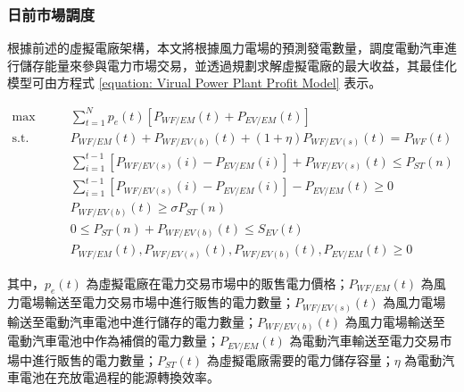\subsubsection{日前市場調度}

根據前述的虛擬電廠架構，本文將根據風力電場的預測發電數量，調度電動汽車進行儲存能量來參與電力市場交易，並透過規劃求解虛擬電廠的最大收益，其最佳化模型可由方程式 \eqref{equation: Virual Power Plant Profit Model} 表示。

\begin{subequations}\label{equation: Virual Power Plant Profit Model}
  \begin{alignat}{2}
    \max        \qquad & \sum_{t = 1}^{N} p_{e}(t) [P_{WF/EM}(t) + P_{EV/EM}(t)]      \label{subequation: Virual Power Plant Profit Model 1} \\
    \text{s.t.} \qquad & P_{WF/EM}(t) + P_{WF/EV(b)}(t) + (1 + \eta)P_{WF/EV(s)}(t) = P_{WF}(t) \label{subequation: Virual Power Plant Profit Model 2} \\
                       & \sum_{i=1}^{t-1} \left[ P_{WF/EV(s)}(i) - P_{EV/EM}(i) \right] + P_{WF/EV(s)}(t) \leq P_{ST}(n)                    \label{subequation: Virual Power Plant Profit Model 3} \\
                       & \sum_{i=1}^{t-1} \left[ P_{WF/EV(s)}(i) - P_{EV/EM}(i) \right] - P_{EV/EM}(t) \geq 0                       \label{subequation: Virual Power Plant Profit Model 4} \\
                       & P_{WF/EV(b)}(t) \geq \sigma P_{ST}(n)                         \label{subequation: Virual Power Plant Profit Model 5} \\
                       & 0 \leq P_{ST}(n) + P_{WF/EV(b)}(t) \leq S_{EV}(t)             \label{subequation: Virual Power Plant Profit Model 6} \\
                       & P_{WF/EM}(t), P_{WF/EV(s)}(t),  P_{WF/EV(b)}(t),P_{EV/EM}(t) \geq 0                 \label{subequation: Virual Power Plant Profit Model 7}      
  \end{alignat}
\end{subequations}

其中，$p_{e} (t)$ 為虛擬電廠在電力交易市場中的販售電力價格；$P_{WF/EM}(t)$ 為風力電場輸送至電力交易市場中進行販售的電力數量；$P_{WF/EV(s)}(t)$ 為風力電場輸送至電動汽車電池中進行儲存的電力數量；$P_{WF/EV(b)}(t)$ 為風力電場輸送至電動汽車電池中作為補償的電力數量；$P_{EV/EM}(t)$ 為電動汽車輸送至電力交易市場中進行販售的電力數量；$P_{ST}(t)$ 為虛擬電廠需要的電力儲存容量；$\eta$ 為電動汽車電池在充放電過程的能源轉換效率。


